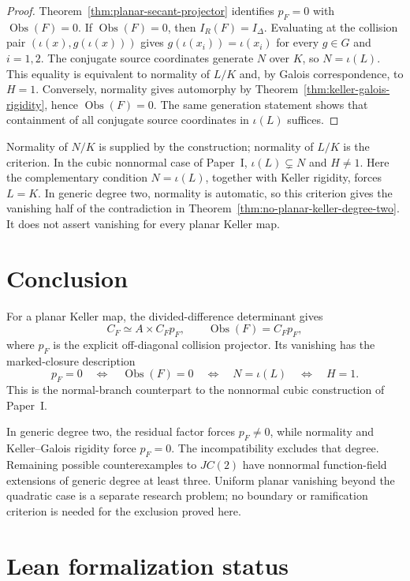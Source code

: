\documentclass[11pt]{article}
\newcommand{\Obs}{\operatorname{Obs}}
\begin{document}
\begin{proof}
Theorem~\ref{thm:planar-secant-projector} identifies \(p_F=0\) with
\(\Obs(F)=0\).  If \(\Obs(F)=0\), then \(I_R(F)=I_\Delta\).
Evaluating at the collision pair \((\iota(x),g(\iota(x)))\) gives
\(g(\iota(x_i))=\iota(x_i)\) for every \(g\in G\) and \(i=1,2\).
The conjugate source coordinates generate \(N\) over \(K\), so
\(N=\iota(L)\).  This equality is equivalent to normality of \(L/K\)
and, by Galois correspondence, to \(H=1\).  Conversely, normality gives
automorphy by Theorem~\ref{thm:keller-galois-rigidity}, hence
\(\Obs(F)=0\).  The same generation statement shows that containment
of all conjugate source coordinates in \(\iota(L)\) suffices.
\end{proof}

Normality of \(N/K\) is supplied by the construction; normality of
\(L/K\) is the criterion.  In the cubic nonnormal case of Paper~I,
\(\iota(L)\subsetneq N\) and \(H\ne1\).  Here the complementary
condition \(N=\iota(L)\), together with Keller rigidity, forces
\(L=K\).  In generic degree two, normality is automatic, so this
criterion gives the vanishing half of the contradiction in
Theorem~\ref{thm:no-planar-keller-degree-two}.  It does not assert
vanishing for every planar Keller map.

\section{Conclusion}
\label{sec:conclusion}

For a planar Keller map, the divided-difference determinant gives
\[
  C_F\simeq A\times C_Fp_F,\qquad
  \Obs(F)=C_Fp_F,
\]
where \(p_F\) is the explicit off-diagonal collision projector.  Its
vanishing has the marked-closure description
\[
  p_F=0
  \quad\Longleftrightarrow\quad\Obs(F)=0
  \quad\Longleftrightarrow\quad N=\iota(L)
  \quad\Longleftrightarrow\quad H=1.
\]
This is the normal-branch counterpart to the nonnormal cubic construction
of Paper~I.

In generic degree two, the residual factor forces \(p_F\neq0\), while
normality and Keller--Galois rigidity force \(p_F=0\).  The incompatibility
excludes that degree.  Remaining possible counterexamples to \(JC(2)\)
have nonnormal function-field extensions of generic degree at least three.
Uniform planar vanishing beyond the quadratic case is a separate research
problem; no boundary or ramification criterion is needed for the exclusion
proved here.

\section{Lean formalization status}
\label{sec:lean-status}
\end{document}
